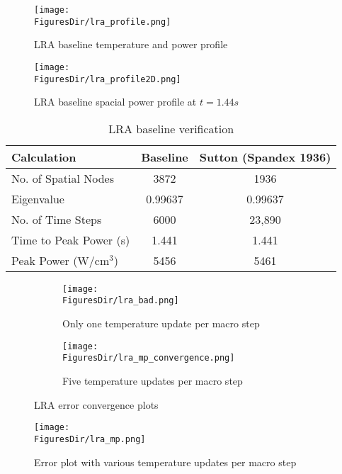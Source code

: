 \begin{figure}[htbp!]
\centering
\texttt{[image: \\FiguresDir/lra\_profile.png]}
\caption{LRA baseline temperature and power profile}
\label{fig:lra_profile}
\end{figure}

\begin{figure}[htbp!]
\centering
\texttt{[image: \\FiguresDir/lra\_profile2D.png]}
\caption{LRA baseline spacial power profile at $t=1.44 s$}
\label{fig:lra_profile2D}
\end{figure}

\begin{table}[!htbp]
\begin{center}
\begin{tabular}{|l|cc|}
\hline
Calculation  &  Baseline & Sutton (Spandex 1936) \\
\hline
No. of Spatial Nodes	& 3872 		& 1936 \\
Eigenvalue 				& 0.99637	& 0.99637 \\
No. of Time Steps 		& 6000 		& 23,890 \\
Time to Peak Power (s) 	& 1.441 	& 1.441 \\
Peak Power (W/cm$^3$) 	& 5456 		& 5461 \\
\hline
\end{tabular}
\end{center}
\caption{LRA baseline verification}
\label{tab:base}
\end{table}

\begin{figure}[!htbp]
\centering
\begin{subfigure}[!htbp]{0.49\textwidth}
\texttt{[image: \\FiguresDir/lra\_bad.png]}
\caption{Only one temperature update per macro step}
\label{fig:lra_bad}
\end{subfigure}
\begin{subfigure}[!htbp]{0.49\textwidth}
\texttt{[image: \\FiguresDir/lra\_mp\_convergence.png]}
\caption{Five temperature updates per macro step}
\label{fig:lra_mpconv}
\end{subfigure}
\caption{LRA error convergence plots}
\end{figure}

\begin{figure}[htbp!]
\centering
\texttt{[image: \\FiguresDir/lra\_mp.png]}
\caption{Error plot with various temperature updates per macro step}
\label{fig:mp}
\end{figure}

